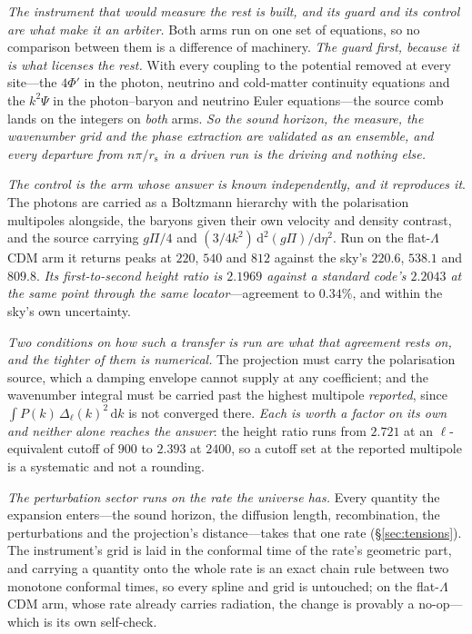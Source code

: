 \documentclass[11pt,a4paper]{article}
\theoremstyle{plain}
\theoremstyle{definition}
\theoremstyle{remark}
\newcommand{\rs}{r_{\mathrm{s}}}
\newcommand{\dd}{\mathrm{d}}   %
\begin{document}
\emph{The instrument that would measure the rest is built, and its guard and its control are what make it an
arbiter.} Both arms run on one set of equations, so no comparison between them is a difference of
machinery. \emph{The guard first, because it is what licenses the rest.}
With every coupling to the potential removed at every site---the $4\Phi'$ in the photon, neutrino and
cold-matter continuity equations and the $k^{2}\Psi$ in the photon--baryon and neutrino Euler equations---the
source comb lands on the integers on \emph{both} arms. \emph{So the sound horizon, the measure, the
wavenumber grid and the phase extraction are validated as an ensemble, and every departure from $n\pi/\rs$ in
a driven run is the driving and nothing else.}

\emph{The control is the arm whose answer is known independently, and it reproduces
it}.
The photons are carried as a Boltzmann hierarchy with the polarisation multipoles alongside, the baryons
given their own velocity and density contrast, and the source carrying $g\Pi/4$ and
$(3/4k^{2})\,\dd^{2}(g\Pi)/\dd\eta^{2}$. Run on the flat-$\Lambda$CDM arm it returns peaks at $220$, $540$ and
$812$ against the sky's $220.6$, $538.1$ and $809.8$. \emph{Its first-to-second height ratio is
$2.1969$ against a standard code's $2.2043$ at the same point through the same locator}---agreement
to $0.34\%$, and within the sky's own uncertainty.

\emph{Two conditions on how such a transfer is run are what that agreement rests on, and the tighter of
them is numerical.} The projection must carry the polarisation source, which a damping envelope cannot
supply at any coefficient; and the wavenumber integral must be carried past the highest multipole
\emph{reported}, since $\int P(k)\,\Delta_{\ell}(k)^{2}\,\dd k$ is not converged there. \emph{Each is worth a
factor on its own and neither alone reaches the answer}: the height ratio runs from $2.721$ at an
$\ell$-equivalent cutoff of $900$ to $2.393$ at $2400$, so a cutoff set at the reported multipole is a
systematic and not a
rounding.

\emph{The perturbation sector runs on the rate the universe has.} Every quantity the expansion enters---the
sound horizon, the diffusion length, recombination, the perturbations and the projection's distance---takes
that one rate (\S\ref{sec:tensions}). The instrument's grid is laid in the conformal time of the rate's
geometric part, and carrying a quantity onto the whole rate is an exact chain rule between two monotone
conformal times, so every spline and grid is untouched; on the flat-$\Lambda$CDM arm, whose rate already
carries radiation, the change is provably a no-op---which is its own self-check.
\end{document}

